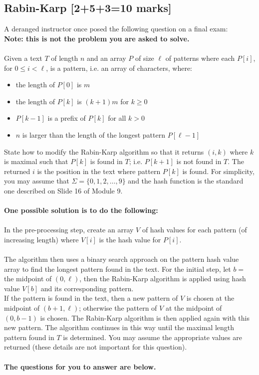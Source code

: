 \documentclass[12pt]{article}
\begin{document}
	\subsection{Rabin-Karp [2+5+3=10 marks]}
	
	A deranged instructor once posed the following question on a final exam: \\
	\textbf{Note: this is not the problem you are asked to solve.} \\
	~\\
	Given a text $T$ of length $n$ and an array $P$ of size $\ell$ of patterns where each $P[i]$, for $0 \leq i < \ell$, is a pattern, i.e. an array of characters, where:
	\begin{itemize}
		\item the length of $P[0]$ is $m$
		\item the length of $P[k]$ is $(k+1)m$ for $k \geq 0$ 
		\item $P[k-1]$ is a prefix of $P[k]$ for all $k > 0$
		\item $n$ is larger than the length of the longest pattern $P[\ell-1]$
	\end{itemize}
	
	State how to modify the Rabin-Karp algorithm so that it returns $(i,k)$ where $k$ is maximal such that $P[k]$ is found in $T$; i.e. $P[k+1]$ is not found in $T$. 
	The returned $i$ is the position in the text where pattern $P[k]$ is found.
	For simplicity, you may assume that $\Sigma = \{0, 1, 2, \ldots, 9\}$ and the hash function is the standard one described on Slide 16 of Module 9. \\
	~\\
	\textbf{One possible solution is to do the following:} \\
	~\\
	In the pre-processing step, create an array $V$ of hash values for each pattern (of increasing length) where $V[i]$ is the hash value for $P[i]$. \\
	~\\
	The algorithm then uses a binary search approach on the pattern hash value array to find the longest pattern found in the text.  
	For the initial step, let $b =$ the midpoint of $(0, \ell)$, then the Rabin-Karp algorithm is applied using hash value $V[b]$ and its corresponding pattern. \\
	If the pattern is found in the text, then a new pattern of $V$ is chosen at the midpoint of $(b+1, \ell)$;
	otherwise the pattern of $V$ at the midpoint of $(0, b-1)$ is chosen.  
	The Rabin-Karp algorithm is then applied again with this new pattern.
	The algorithm continues in this way until the maximal length pattern found in $T$ is determined.
	You may assume the appropriate values are returned (these details are not important for this question). \\
	~\\
	\textbf{The questions for you to answer are below.}
	
\end{document}
